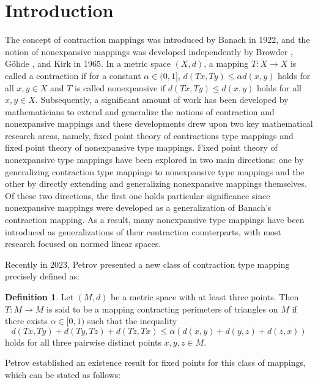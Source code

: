 \documentclass[11pt,reqno]{amsart}
\theoremstyle{definition}
\newtheorem{definition}[theorem]{Definition}
\newtheorem{Open Prob}[theorem]{Open Problem}
\theoremstyle{remark}
\numberwithin{equation}{section}
\begin{document}
		
\section{Introduction}
\noindent
The concept of contraction mappings was introduced by Banach \cite{B22} in 1922, and the notion of nonexpansive mappings was developed independently by Browder \cite{B65}, Göhde \cite{G65}, and Kirk \cite{K65} in 1965.  In a metric space $(X,d)$, a mapping $T:X\to X$ is called a contraction  if for a constant $\alpha\in (0,1]$, $d(Tx,Ty)\leq \alpha d(x,y)$ holds for all $x,y\in X$ and $T$ is called nonexpansive if $d(Tx,Ty)\leq  d(x,y)$ holds for all $x,y\in X.$
Subsequently, a significant amount of work has been developed by mathematicians to extend and generalize the notions of contraction and nonexpansive mappings and these developments drew upon two key mathematical research areas,   namely, fixed point theory of contractions type mappings and fixed point theory of nonexpansive type mappings. Fixed point theory of nonexpansive type mappings have been explored in two main directions: one by generalizing contraction type mappings to nonexpansive type mappings and the other by directly extending and generalizing nonexpansive mappings themselves. Of these two directions, the first one holds particular significance since nonexpansive mappings were developed as a generalization of Banach's contraction mapping.  As a result, many nonexpansive type mappings have been introduced as generalizations of their contraction counterparts, with most research focused on normed linear spaces.

Recently in $2023$, Petrov \cite{P23}  presented a new class of contraction type mapping precisely defined as: 
\begin{definition}\cite[\, p. 2, Definition~2.1]{P23}\label{D11}
Let $(M,d)$ be a metric space with at least three points. Then  $T: M \to M$ is said to be a mapping contracting perimeters of triangles on $M$ if there exists $\alpha \in [0,1)$ such that the inequality
    \begin{equation}\label{mcpt1}
        d(Tx,Ty)+ d(Ty,Tz)+ d(Tz,Tx) \le \alpha (d(x,y)+ d(y,z)+ d(z,x))
        \end{equation}
        holds for all three pairwise distinct points $x, y, z \in M$.
\end{definition}
Petrov established an existence result for fixed points for this class of mappings, which can be stated as follows:
\end{document}
